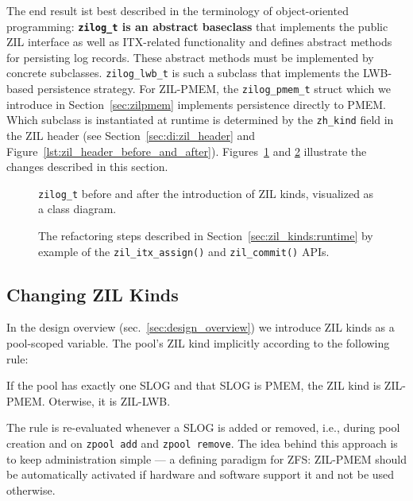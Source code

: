 \documentclass[12pt,a4paper,twoside]{book}
\begin{document}
The end result ist best described in the terminology of object-oriented programming:
\textbf{\lstinline{zilog_t} is an abstract baseclass} that implements the public ZIL interface as well as ITX-related functionality and defines abstract methods for persisting log records.
These abstract methods must be implemented by concrete subclasses.
\lstinline{zilog_lwb_t} is such a subclass that implements the LWB-based persistence strategy.
For ZIL-PMEM, the \lstinline{zilog_pmem_t} struct which we introduce in Section~\ref{sec:zilpmem} implements persistence directly to PMEM.
Which subclass is instantiated at runtime is determined by the \lstinline{zh_kind} field in the ZIL header (see Section~\ref{sec:di:zil_header} and Figure~\ref{lst:zil_header_before_and_after}).
Figures~\ref{fig:zilog_splitup_class_diagram} and \ref{fig:zilog_splitup_example_code} illustrate the changes described in this section.

\begin{figure}
\missingfigure[figheight=10cm]{}
\caption{\lstinline{zilog_t} before and after the introduction of ZIL kinds, visualized as a class diagram.}
\label{fig:zilog_splitup_class_diagram}
\end{figure}

\begin{figure}
\missingfigure[figheight=20cm]{}
\caption{The refactoring steps described in Section~\ref{sec:zil_kinds:runtime} by example of the \lstinline{zil_itx_assign()} and \lstinline{zil_commit()} APIs.}
\label{fig:zilog_splitup_example_code}
\end{figure}

\subsection{Changing ZIL Kinds}
In the design overview (sec.~\ref{sec:design_overview}) we introduce ZIL kinds as a pool-scoped variable.
The pool's ZIL kind implicitly according to the following rule:
\begin{displayquote}
If the pool has exactly one SLOG and that SLOG is PMEM, the ZIL kind is ZIL-PMEM. Oterwise, it is ZIL-LWB.
\end{displayquote}
The rule is re-evaluated whenever a SLOG is added or removed, i.e., during pool creation and on \texttt{zpool add} and \texttt{zpool remove}.
The idea behind this approach is to keep administration simple --- a defining paradigm for ZFS:
ZIL-PMEM should be automatically activated if hardware and software support it and not be used otherwise.
\end{document}
